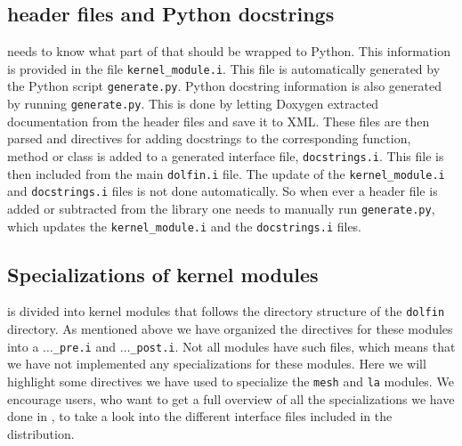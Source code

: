 \begin{code}
\subsection{\dolfin header files and Python docstrings}
\swig needs to know what part of \dolfin that should be wrapped to Python. This information is provided in the file \texttt{kernel\_module.i}. This file is automatically generated by the Python script \texttt{generate.py}. Python docstring information is also generated by running \texttt{generate.py}. This is done by letting Doxygen extracted documentation from the header files and save it to XML. These files are then parsed and \swig directives for adding docstrings to the corresponding function, method or class is added to a generated interface file, \texttt{docstrings.i}. This file is then included from the main \texttt{dolfin.i} file. The update of the \texttt{kernel\_module.i} and \texttt{docstrings.i} files is not done automatically. So when ever a header file is added or subtracted from the \dolfin library one needs to manually run \texttt{generate.py}, which updates the \texttt{kernel\_module.i} and the \texttt{docstrings.i} files.\par

\subsection{Specializations of kernel modules}
\dolfin is divided into kernel modules that follows the directory structure of the \texttt{dolfin} directory. As mentioned above we have organized the \swig directives for these modules into a \texttt{$\ldots$\_pre.i} and \texttt{$\ldots$\_post.i}. Not all modules have such files, which means that we have not implemented any specializations for these modules. Here we will highlight some \swig directives we have used to specialize the \texttt{mesh} and \texttt{la} modules. We encourage users, who want to get a full overview of all the specializations we have done in \pydolfin, to take a look into the different \swig interface files included in the distribution.\par


\end{code}
